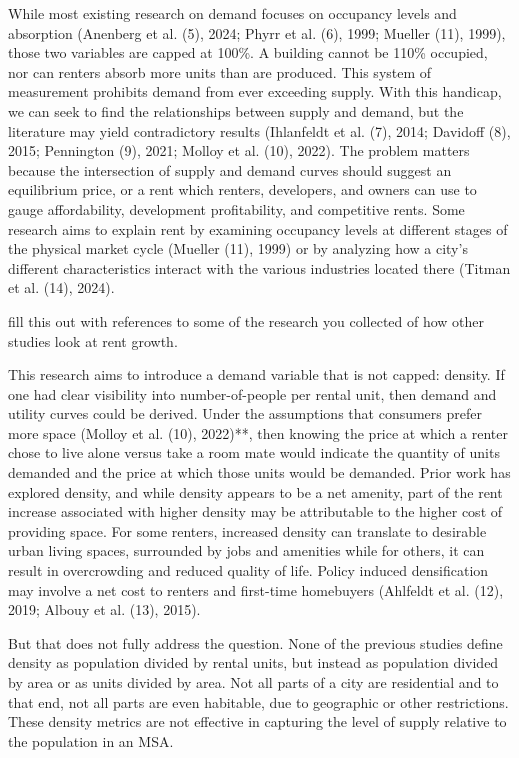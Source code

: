 \documentclass[sn-mathphys-num]{sn-jnl}%
\theoremstyle{thmstyleone}%
\theoremstyle{thmstyletwo}%
\theoremstyle{thmstylethree}%
\begin{document}
While most existing research on demand focuses on occupancy levels and absorption (Anenberg et al. (5), 2024; Phyrr et al. (6), 1999; Mueller (11), 1999), those two variables are capped at 100\%. A building cannot be 110\% occupied, nor can renters absorb more units than are produced. This system of measurement prohibits demand from ever exceeding supply. With this handicap, we can seek to find the relationships between supply and demand, but the literature may yield contradictory results (Ihlanfeldt et al. (7), 2014; Davidoff (8), 2015; Pennington (9), 2021; Molloy et al. (10), 2022). The problem matters because the intersection of supply and demand curves should suggest an equilibrium price, or a rent which renters, developers, and owners can use to gauge affordability, development profitability, and competitive rents. Some research aims to explain rent by examining occupancy levels at different stages of the physical market cycle (Mueller (11), 1999) or by analyzing how a city’s different characteristics interact with the various industries located there (Titman et al. (14), 2024).   

fill this out with references to some of the research you collected of how other studies look at rent growth.  

   

This research aims to introduce a demand variable that is not capped: density. If one had clear visibility into number-of-people per rental unit, then demand and utility curves could be derived. Under the assumptions that consumers prefer more space (Molloy et al. (10), 2022)**, then knowing the price at which a renter chose to live alone versus take a room mate would indicate the quantity of units demanded and the price at which those units would be demanded. Prior work has explored density, and while density appears to be a net amenity, part of the rent increase associated with higher density may be attributable to the higher cost of providing space. For some renters, increased density can translate to desirable urban living spaces, surrounded by jobs and amenities while for others, it can result in overcrowding and reduced quality of life. Policy induced densification may involve a net cost to renters and first-time homebuyers (Ahlfeldt et al. (12), 2019; Albouy et al. (13), 2015). 

   

But that does not fully address the question. None of the previous studies define density as population divided by rental units, but instead as population divided by area or as units divided by area. Not all parts of a city are residential and to that end, not all parts are even habitable, due to geographic or other restrictions. These density metrics are not effective in capturing the level of supply relative to the population in an MSA.  
\end{document}
